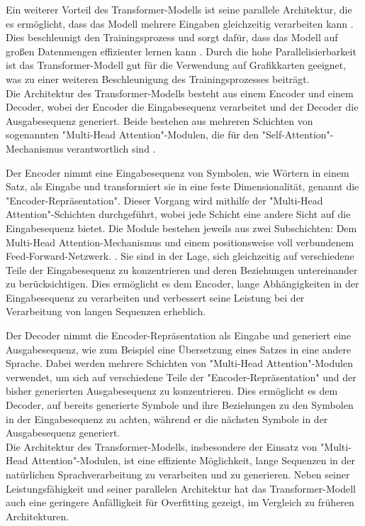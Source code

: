 \documentclass[oneside,bibliography=totocnumbered,BCOR=5mm]{scrbook}%
\theoremstyle{definition}
\theoremstyle{definition}
\theoremstyle{definition}
\theoremstyle{definition}
\theoremstyle{definition}
\theoremstyle{definition}
\begin{document}
Ein weiterer Vorteil des Transformer-Modells ist seine parallele Architektur, die es ermöglicht, 
dass das Modell mehrere Eingaben gleichzeitig verarbeiten kann \autocite[Seite 2]{transformer}. 
Dies beschleunigt den Trainingsprozess und sorgt dafür, dass das Modell
auf großen Datenmengen effizienter lernen kann \autocite[Seite 8]{transformer}. 
Durch die hohe Parallelisierbarkeit ist das Transformer-Modell gut für die Verwendung auf Grafikkarten geeignet, 
was zu einer weiteren Beschleunigung des Trainingsprozesses beiträgt. \\


Die Architektur des Transformer-Modells besteht aus einem Encoder und einem Decoder, 
wobei der Encoder die Eingabesequenz verarbeitet und der Decoder die Ausgabesequenz generiert. 
Beide bestehen aus mehreren Schichten von sogenannten "Multi-Head Attention"-Modulen, die für den "Self-Attention"-Mechanismus verantwortlich sind \autocite[Seite 3]{transformer}. 


Der Encoder nimmt eine Eingabesequenz von Symbolen, wie Wörtern in einem Satz, 
als Eingabe und transformiert sie in eine feste Dimensionalität, genannt die "Encoder-Repräsentation". 
Dieser Vorgang wird mithilfe der "Multi-Head Attention"-Schichten durchgeführt, wobei jede Schicht eine andere Sicht auf die Eingabesequenz bietet. 
Die Module bestehen jeweils aus zwei Subschichten: Dem Multi-Head Attention-Mechanismus und einem positionsweise voll verbundenem Feed-Forward-Netzwerk. \autocite[Seite 3]{transformer}.
Sie sind in der Lage, sich gleichzeitig auf verschiedene Teile der Eingabesequenz zu konzentrieren und deren Beziehungen untereinander zu berücksichtigen. 
Dies ermöglicht es dem Encoder, lange Abhängigkeiten in der Eingabesequenz zu verarbeiten und verbessert seine Leistung bei der Verarbeitung von langen Sequenzen erheblich. 


Der Decoder nimmt die Encoder-Repräsentation als Eingabe und generiert eine Ausgabesequenz, wie zum Beispiel eine Übersetzung eines Satzes in eine andere Sprache. 
Dabei werden mehrere Schichten von "Multi-Head Attention"-Modulen verwendet, um sich auf verschiedene Teile der "Encoder-Repräsentation" und der bisher generierten Ausgabesequenz zu konzentrieren. 
Dies ermöglicht es dem Decoder, auf bereits generierte Symbole und ihre Beziehungen zu den Symbolen in der Eingabesequenz zu achten, während er die nächsten Symbole in der Ausgabesequenz generiert. \\


Die Architektur des Transformer-Modells, insbesondere der Einsatz von "Multi-Head Attention"-Modulen, ist eine effiziente Möglichkeit, 
lange Sequenzen in der natürlichen Sprachverarbeitung zu verarbeiten und zu generieren. 
Neben seiner Leistungsfähigkeit und seiner parallelen Architektur hat das 
Transformer-Modell auch eine geringere Anfälligkeit für Overfitting gezeigt, 
im Vergleich zu früheren Architekturen. \\
\end{document}
